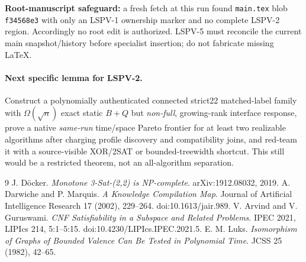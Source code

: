 \documentclass[10pt]{article}
\begin{document}
\noindent \textbf{Root-manuscript safeguard:} a fresh fetch at this run found \texttt{main.tex} blob \texttt{f34568e3} with only an LSPV-1 ownership marker and no complete LSPV-2 region. Accordingly no root edit is authorized. LSPV-5 must reconcile the current main snapshot/history before specialist insertion; do not fabricate missing LaTeX.

\paragraph{Next specific lemma for LSPV-2.} Construct a polynomially authenticated connected strict22 matched-label family with $\Omega(\sqrt n)$ exact static $B+Q$ but \emph{non-full}, growing-rank interface response, prove a native \emph{same-run} time/space Pareto frontier for at least two realizable algorithms after charging profile discovery and compatibility joins, and red-team it with a source-visible XOR/2SAT or bounded-treewidth shortcut. This still would be a restricted theorem, not an all-algorithm separation.

\begin{thebibliography}{9}
 J. D\"ocker. \emph{Monotone 3-Sat-(2,2) is NP-complete}. arXiv:1912.08032, 2019.
 A. Darwiche and P. Marquis. \emph{A Knowledge Compilation Map}. Journal of Artificial Intelligence Research 17 (2002), 229--264. doi:10.1613/jair.989.
 V. Arvind and V. Guruswami. \emph{CNF Satisfiability in a Subspace and Related Problems}. IPEC 2021, LIPIcs 214, 5:1--5:15. doi:10.4230/LIPIcs.IPEC.2021.5.
 E. M. Luks. \emph{Isomorphism of Graphs of Bounded Valence Can Be Tested in Polynomial Time}. JCSS 25 (1982), 42--65.
\end{thebibliography}
\end{document}
